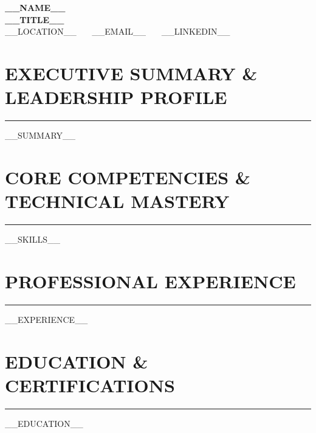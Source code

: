 \documentclass[10pt,letterpaper]{article}
\begin{document}
\begin{center}
    {\LARGE \textbf{\color{darkgray} __NAME__}} \\ \vspace{2pt}
    {\large \textbf{__TITLE__}} \\ \vspace{2pt}
    \small __LOCATION__ \ \textbar\ \ __EMAIL__ \ \textbar\ \ __LINKEDIN__
\end{center}

\vspace{-4pt}
\section*{\large\bfseries\color{primary}\uppercase{Executive Summary \& Leadership Profile}}
\vspace{-4pt}\rule{\textwidth}{0.8pt}\vspace{3pt}
__SUMMARY__

\section*{\large\bfseries\color{primary}\uppercase{Core Competencies \& Technical Mastery}}
\vspace{-4pt}\rule{\textwidth}{0.8pt}\vspace{3pt}
\small
__SKILLS__

\section*{\large\bfseries\color{primary}\uppercase{Professional Experience}}
\vspace{-4pt}\rule{\textwidth}{0.8pt}\vspace{3pt}
\small
__EXPERIENCE__

\section*{\large\bfseries\color{primary}\uppercase{Education \& Certifications}}
\vspace{-4pt}\rule{\textwidth}{0.8pt}\vspace{3pt}
\small
__EDUCATION__
\end{document}
